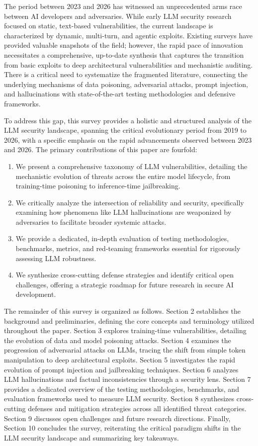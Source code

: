 \documentclass[11pt,a4paper]{article}
\begin{document}
The period between 2023 and 2026 has witnessed an unprecedented arms race between AI developers and adversaries. While early LLM security research focused on static, text-based vulnerabilities, the current landscape is characterized by dynamic, multi-turn, and agentic exploits. Existing surveys have provided valuable snapshots of the field; however, the rapid pace of innovation necessitates a comprehensive, up-to-date synthesis that captures the transition from basic exploits to deep architectural vulnerabilities and mechanistic auditing. There is a critical need to systematize the fragmented literature, connecting the underlying mechanisms of data poisoning, adversarial attacks, prompt injection, and hallucinations with state-of-the-art testing methodologies and defensive frameworks.

To address this gap, this survey provides a holistic and structured analysis of the LLM security landscape, spanning the critical evolutionary period from 2019 to 2026, with a specific emphasis on the rapid advancements observed between 2023 and 2026. The primary contributions of this paper are fourfold:
\begin{enumerate}
 \item We present a comprehensive taxonomy of LLM vulnerabilities, detailing the mechanistic evolution of threats across the entire model lifecycle, from training-time poisoning to inference-time jailbreaking.
 \item We critically analyze the intersection of reliability and security, specifically examining how phenomena like LLM hallucinations are weaponized by adversaries to facilitate broader systemic attacks.
 \item We provide a dedicated, in-depth evaluation of testing methodologies, benchmarks, metrics, and red-teaming frameworks essential for rigorously assessing LLM robustness.
 \item We synthesize cross-cutting defense strategies and identify critical open challenges, offering a strategic roadmap for future research in secure AI development.
\end{enumerate}
The remainder of this survey is organized as follows. Section 2 establishes the background and preliminaries, defining the core concepts and terminology utilized throughout the paper. Section 3 explores training-time vulnerabilities, detailing the evolution of data and model poisoning attacks. Section 4 examines the progression of adversarial attacks on LLMs, tracing the shift from simple token manipulation to deep architectural exploits. Section 5 investigates the rapid evolution of prompt injection and jailbreaking techniques. Section 6 analyzes LLM hallucinations and factual inconsistencies through a security lens. Section 7 provides a dedicated overview of the testing methodologies, benchmarks, and evaluation frameworks used to measure LLM security. Section 8 synthesizes cross-cutting defenses and mitigation strategies across all identified threat categories. Section 9 discusses open challenges and future research directions. Finally, Section 10 concludes the survey, reiterating the critical paradigm shifts in the LLM security landscape and summarizing key takeaways.
\end{document}
